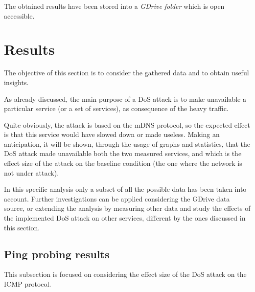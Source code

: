 \documentclass[fleqn, 11pt]{SelfArx} %
\begin{document}
The obtained results have been stored into a {\it{GDrive folder}} \cite{GDrive} which is open accessible.


\section{Results}
The objective of this section is to consider the gathered data and to obtain useful insights. \newline

As already discussed, the main purpose of a DoS attack is to make unavailable a particular service (or a set of services), as consequence of the heavy traffic. \newline

Quite obviously, the attack is based on the mDNS protocol, so the expected effect is that this service would have slowed down or made useless.
Making an anticipation, it will be shown, through the usage of graphs and statistics, that the DoS attack made unavailable both the two measured services, and which is the effect size of the attack on the baseline condition (the one where the network is not under attack). \newline

In this specific analysis only a subset of all the possible data has been taken into account.
Further investigations can be applied considering the GDrive data source, or extending the analysis by measuring other data and study the effects of the implemented DoS attack on other services, different by the ones discussed in this section.

\subsection{Ping probing results}
This subsection is focused on considering the effect size of the DoS attack on the ICMP protocol.
\end{document}

